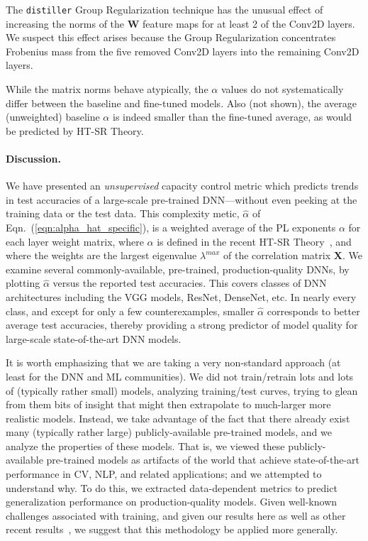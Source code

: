 \vspace{-3mm}
The \texttt{distiller} Group Regularization technique has the unusual effect of increasing the norms of the $\mathbf{W}$ feature maps for at least 2 of the Conv2D layers.
We suspect this effect arises because the Group Regularization concentrates Frobenius mass from the five removed Conv2D layers into the remaining Conv2D layers.

While the matrix norms behave atypically, the $\alpha$ values do not systematically differ between the baseline and fine-tuned models.
Also (not shown), the average (unweighted) baseline $\alpha$ is indeed smaller than the fine-tuned average, as would be predicted by HT-SR Theory.

\vspace{-3mm}
\paragraph{Discussion.}

We have presented an \emph{unsupervised} capacity control metric which predicts trends in test accuracies of a large-scale pre-trained DNN---without even peeking at the training data or the test data. 
This complexity metic, $\hat{\alpha}$ of Eqn.~(\ref{eqn:alpha_hat_specific}), is a weighted average of the PL exponents $\alpha$ for each layer weight matrix, where $\alpha$ is defined in the recent HT-SR Theory~\cite{MM18_TR,MM19_HTSR_ICML}, and where the weights are the largest eigenvalue $\lambda^{max}$ of the correlation matrix $\mathbf{X}$.  
%
We examine several commonly-available, pre-trained, production-quality DNNs, by plotting $\hat{\alpha}$ versus the reported test accuracies.
This covers classes of DNN architectures including the VGG models, ResNet, DenseNet, etc. 
In nearly every class, and except for only a few counterexamples, smaller $\hat{\alpha}$ corresponds to better average test accuracies, thereby providing a strong predictor of model quality for large-scale state-of-the-art DNN models.

It is worth emphasizing that we are taking a very non-standard approach (at least for the DNN and ML communities).
We did not train/retrain lots and lots of (typically rather small) models, analyzing training/test curves, trying to glean from them bits of insight that might then extrapolate to much-larger more realistic models.
Instead, we take advantage of the fact that there already exist many (typically rather large) publicly-available pre-trained models, and we analyze the properties of these models.
That is, we viewed these publicly-available pre-trained models as artifacts of the world that achieve state-of-the-art performance in CV, NLP, and related applications; and we attempted to understand why.
To do this, we extracted data-dependent metrics to predict generalization performance on production-quality models.
Given well-known challenges associated with training, and given our results here as well as other recent results~\cite{MM18_TR,MM19_HTSR_ICML},
we suggest that this methodology be applied more generally.

